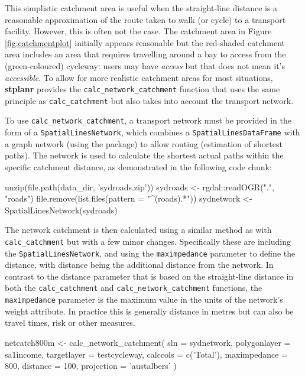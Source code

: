 This simplistic catchment area is useful when the straight-line distance
is a reasonable approximation of the route taken to walk (or cycle) to a
transport facility. However, this is often not the case. The catchment
area in Figure \ref{fig:catchmentplot} initially appears reasonable but
the red-shaded catchment area includes an area that requires travelling
around a bay to access from the (green-coloured) cycleway:
users may have \emph{access} but that does not mean it's \emph{accessible}. To allow for
more realistic catchment areas for most situations, \textbf{stplanr}
provides the \texttt{calc\_network\_catchment} function that uses the
same principle as \texttt{calc\_catchment} but also takes into account
the transport network.

To use \texttt{calc\_network\_catchment}, a transport network
must be provided in the form of a
\texttt{SpatialLinesNetwork}, which combines a
\texttt{SpatialLinesDataFrame} with a graph network (using the
 package) to allow routing (estimation of shortest paths).
The network is used to calculate the shortest actual paths within the
specific catchment distance, as demonstrated in the following code chunk:

\begin{Schunk}
\begin{Sinput}
unzip(file.path(data_dir, 'sydroads.zip'))
sydroads <- rgdal::readOGR(".", "roads")
file.remove(list.files(pattern = "^(roads).*"))
sydnetwork <- SpatialLinesNetwork(sydroads)
\end{Sinput}
\end{Schunk}

The network catchment is then calculated using a similar method as with
\texttt{calc\_catchment} but with a few minor changes. Specifically
these are including the \texttt{SpatialLinesNetwork}, and using the
\texttt{maximpedance} parameter to define the distance, with distance
being the additional distance from the network. In contrast to the
distance parameter that is based on the straight-line distance in both
the \texttt{calc\_catchment} and \texttt{calc\_network\_catchment}
functions, the \texttt{maximpedance} parameter is the maximum value in
the units of the network's weight attribute. In practice this is
generally distance in metres but can also be travel times, risk or other
measures.

\begin{Schunk}
\begin{Sinput}
netcatch800m <- calc_network_catchment(
  sln = sydnetwork,
  polygonlayer = sa1income,
  targetlayer = testcycleway,
  calccols = c('Total'),
  maximpedance = 800,
  distance = 100,
  projection = 'austalbers'
)
\end{Sinput}
\end{Schunk}

